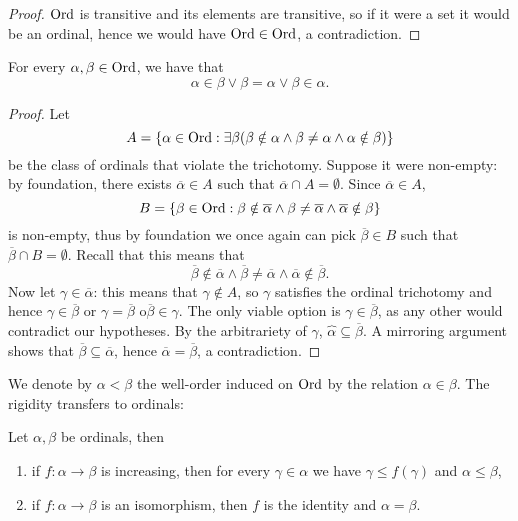 \documentclass[twoside,openright,titlepage,numbers=noenddot,%
               headinclude,footinclude,cleardoublepage=empty,abstract=on,
               BCOR=23mm,paper=letter,fontsize=11pt
               ]{scrreprt}
\begin{document}
\begin{proof}
    $\mathrm{Ord}$ is transitive and its elements are transitive, so if it were a set it would be an ordinal, hence we would have $\mathrm{Ord} \in \mathrm{Ord}$, a contradiction.
\end{proof}
\begin{theorem}
    For every $\alpha,\beta \in \mathrm{Ord}$, we have that
    \[ \alpha \in \beta \lor \beta = \alpha \lor \beta \in \alpha. \]
\end{theorem}
\begin{proof}
    Let
    \[ A = \{\alpha \in \mathrm{Ord}: \exists \beta(\beta \notin \alpha \land \beta \neq \alpha \land \alpha \notin \beta)\} \]
    be the class of ordinals that violate the trichotomy. Suppose it were non-empty: by foundation, there exists $\overline{\alpha} \in A$ such that $\overline{\alpha} \cap A = \emptyset$. Since $\overline{\alpha} \in A$,
    \[ B = \{\beta \in \mathrm{Ord}: \beta \notin \overline{\alpha} \land \beta \neq \overline{\alpha} \land \overline{\alpha} \notin \beta\}\]
    is non-empty, thus by foundation we once again can pick $\overline{\beta} \in B$ such that $\overline{\beta} \cap B = \emptyset$. Recall that this means that
    \[ \overline{\beta} \notin \overline{\alpha} \land \overline{\beta} \neq \overline{\alpha} \land \overline{\alpha} \notin \overline{\beta}. \]
    Now let $\gamma \in \overline{\alpha}$: this means that $\gamma \notin A$, so $\gamma$ satisfies the ordinal trichotomy and hence $\gamma \in \overline{\beta}$ or $\gamma = \overline{\beta}$ o$ \overline{\beta} \in \gamma$. The only viable option is $\gamma \in \overline{\beta}$, as any other would contradict our hypotheses. By the arbitrariety of $\gamma$, $\overbrace{\alpha} \subseteq \overline{\beta}$. A mirroring argument shows that $\overline{\beta} \subseteq \overline{\alpha}$, hence $\overline{\alpha} = \overline{\beta}$, a contradiction.
\end{proof}
We denote by $\alpha < \beta$ the well-order induced on $\mathrm{Ord}$ by the relation $\alpha \in \beta$. The rigidity transfers to ordinals:
\begin{proposition}
    Let $\alpha,\beta$ be ordinals, then
    \begin{enumerate}
        \item if $f: \alpha \to \beta$ is increasing, then for every $\gamma \in \alpha$ we have $\gamma \leq f(\gamma)$ and $\alpha \leq \beta$,
        \item if $f: \alpha \to \beta$ is an isomorphism, then $f$ is the identity and $\alpha = \beta$.    
    \end{enumerate}
\end{proposition}
\end{document}

